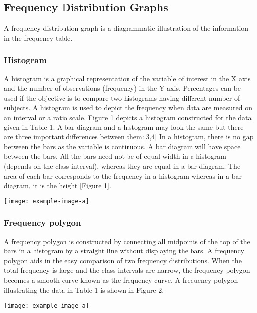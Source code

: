 \subsection{Frequency Distribution Graphs}
A frequency distribution graph is a diagrammatic illustration of the information 
in the frequency table. 

\subsubsection{Histogram}
A histogram is a graphical representation of the variable of interest in the X axis and the number of observations
(frequency) in the Y axis. Percentages can be used if the
objective is to compare two histograms having different
number of subjects. A histogram is used to depict the frequency
when data are measured on an interval or a ratio scale. Figure 1
depicts a histogram constructed for the data given in Table 1.
A bar diagram and a histogram may look the same but there
are three important differences between them:[3,4]
In a histogram, there is no gap between the bars as the variable
is continuous. A bar diagram will have space between the bars.
All the bars need not be of equal width in a histogram (depends
on the class interval), whereas they are equal in a bar diagram.
The area of each bar corresponds to the frequency in a
histogram whereas in a bar diagram, it is the height [Figure 1].

\texttt{[image: example-image-a]} 

\subsubsection{Frequency polygon}
A frequency polygon is constructed by connecting all
midpoints of the top of the bars in a histogram by a straight
line without displaying the bars. A frequency polygon aids in
the easy comparison of two frequency distributions. When
the total frequency is large and the class intervals are narrow,
the frequency polygon becomes a smooth curve known as the
frequency curve. A frequency polygon illustrating the data in
Table 1 is shown in Figure 2.

\texttt{[image: example-image-a]} 

